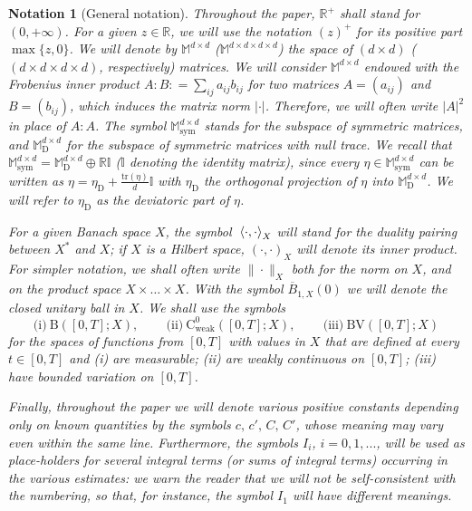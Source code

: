 \documentclass[a4paper,10pt,reqno]{amsart}
\numberwithin{equation}{section}
\newcommand{\bbM}{\mathbb{M}}
\newcommand{\R}{\mathbb{R}}
\numberwithin{equation}{section}
\newtheorem{notation}[theorem]{Notation}
\newcommand{\pairing}[4]{ \sideset{_{ #1 }}{_{ #2 }}  {\mathop{\langle #3 , #4
\rangle}}}
\newcommand{\BV}{\mathrm{BV}}
\newcommand{\bbI}{\mathbb{I}}
\newcommand{\mt}{\bbM}
\newcommand{\sym}{\mathrm{sym}}
\newcommand{\dev}{\mathrm{D}}
\begin{document}
\begin{notation}[General notation]
\label{not:2.1} \upshape
Throughout the paper,  $\R^+$ shall stand for $(0,+\infty)$. 
For a given $z\in \R$, we will use the notation $(z)^+$ for its positive part $\max\{z,0\}$. 
We will denote by $\mt^{d\times d}$  ($\mt^{d\times d\times d \times d}$) the space of $(d{\times} d)$ ($(d {\times} d{\times} d {\times} d)$, respectively) matrices. We will  consider $\mt^{d\times d}$   endowed with the  Frobenius inner product 
$A : B : = \sum_{i j} a_{ij} b_{ij}$ for two matrices $A = (a_{ij})$ and $B = (b_{ij})$, which induces the matrix norm $|\cdot|$. 
Therefore, we will often write $|A|^2$ in place of $A:A$. The symbol
$\mt_\sym^{d\times d}$ stands for the subspace of symmetric matrices, and $\mt_\dev^{d\times d}$ for the subspace of symmetric matrices with null trace. We recall that 
$\mt_\sym^{d\times d} = \mt_\dev^{d\times d} \oplus \R \bbI$ ($\bbI$ denoting the identity matrix), since every $\eta \in \mt_\sym^{d\times d}$ can be written as 
$
\eta = \eta_\dev+ \tfrac{\mathrm{tr}(\eta)}d \bbI
$
with $\eta_\dev$ the orthogonal projection of $\eta$ into $\mt_\dev^{d\times d} $. We will refer to $\eta_\dev$ as the deviatoric part of $\eta$.  
\par
For a given 
Banach space $X$,
 the symbol $\pairing{}{X}{\cdot}{\cdot}$  will stand for the duality
pairing between $X^*$ and $X$; if $X$ is a Hilbert space, $(\cdot,\cdot)_X$ will denote its inner product. For simpler notation, we shall often write $\| \cdot\|_X$ both for the norm on $X$, and on the product space  $X \times  \ldots \times X$.  With the symbol $\overline{B}_{1,X}(0)$ we will denote the closed unitary ball in $X$. 
We  shall use the symbols
 \[
\text{(i)} \  \mathrm{B}([0,T]; X), \, \qquad \text{(ii)} \  \mathrm{C}^0_{\mathrm{weak}}([0,T];X), \, \qquad \text{(iii)} \  \BV ([0,T]; X)
 \]
 for the spaces
of functions from $[0,T]$ with values in $ X$ that are defined at
\emph{every}  $t \in [0,T]$ and  (i) are measurable; (ii) are  \emph{weakly} continuous   on  $[0,T]$; (iii)  have  bounded variation on  $[0,T]$.
\par
Finally, throughout the paper we will denote various  positive constants depending only on
known quantities  by the symbols
$c,\,c',\, C,\,C'$,  whose meaning may vary even within the same   line.      Furthermore, the symbols $I_i$,  $i = 0, 1,... $,
will be used as place-holders for several integral terms (or sums of integral terms) occurring in
the various estimates: we warn the reader that we will not be
self-consistent with the numbering, so that, for instance, the
symbol $I_1$ will have  different meanings.
\end{notation}
\end{document}
